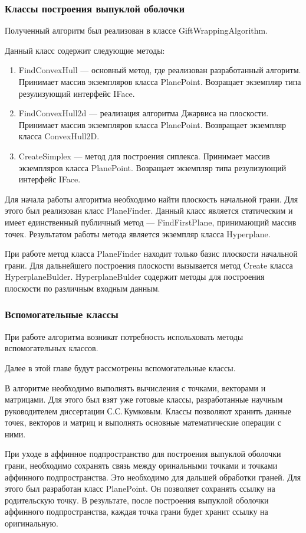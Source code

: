 \documentclass[14pt]{extarticle}
\begin{document}
\subsubsection{Классы построения выпуклой оболочки}
Полученный алгоритм был реализован в классе GiftWrappingAlgorithm.

Данный класс содержит следующие методы:
\begin{enumerate}[topsep=-0.5\parsep,itemsep=-0.5\parsep]
  \item FindConvexHull --- основный метод, где реализован разработанный алгоритм. Принимает массив экземпляров класса PlanePoint. Возращает экземпляр типа резулизующий интерфейс IFace.
  \item FindConvexHull2d --- реализация алгоритма Джарвиса на плоскости. Принимает массив экземпляров класса PlanePoint. Возвращает экземпляр класса ConvexHull2D.
  \item CreateSimplex --- метод для построения сиплекса. Принимает массив экземпляров класса PlanePoint. Возращает экземпляр типа резулизующий интерфейс IFace.
\end{enumerate}
\medskip

Для начала работы алгоритма необходимо найти плоскость начальной грани. Для этого был реализован класс PlaneFinder. Данный класс является статическим и имеет единственный публичный метод --- FindFirstPlane, принимающий массив точек. Результатом работы метода является экземпляр класса Hyperplane.

При работе метод класса PlaneFinder находит только базис плоскости начальной грани. Для дальнейшего построения плоскости вызывается метод Create класса HyperplaneBulder. HyperplaneBulder содержит методы для построения плоскости по различным входным данным.

\subsubsection{Вспомогательные классы}
При работе алгоритма возникат потребность испольховать методы вспомогательных классов.

Далее в этой главе будут рассмотрены вспомогательные классы.

В алгоритме необходимо выполнять вычисления с точками, векторами и матрицами. Для этого был взят уже готовые классы, разработанные научным руководителем диссертации С.С.\,Кумковым. Классы позволяют хранить данные точек, векторов и матриц и выполнять основные математические операции с ними.

При уходе в аффинное подпространство для построения выпуклой оболочки грани, необходимо сохранять связь между оринальными точками и точками аффинного подпространства. Это необходимо для дальшей обработки граней.  Для этого был разработан класс PlanePoint. Он позволяет сохранять ссылку на родительскую точку. В результате, после построения выпуклой оболочки аффинного подпространства, каждая точка грани будет хранит ссылку на оригинальную.
\end{document}
